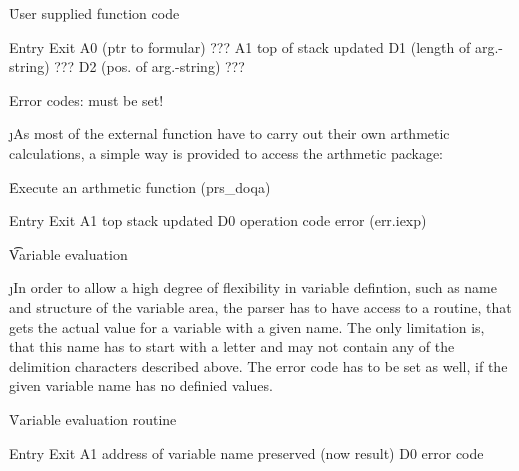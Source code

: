 \f

     User supplied function code

          Entry                         Exit
     A0  (ptr to formular)              ???
     A1   top of stack                  updated
     D1  (length of arg.-string)        ???
     D2  (pos. of arg.-string)          ???

     Error codes: must be set!


\j As most of the external function have to carry out their own
arthmetic calculations, a simple way is provided to access the
arthmetic package:

\f

     Execute an arthmetic function
     (prs_doqa)

          Entry                         Exit
     A1   top stack                     updated
     D0   operation code                error (err.iexp)



\t Variable evaluation

\j In order to allow a high degree of flexibility
in variable defintion, such as
name and structure of the variable area, the parser has to have
access to a routine, that gets the actual value for a variable with
a given name. The only limitation is, that this name has to start
with a letter and may not contain any of the delimition characters
described above. The error code has to be set as well, if the given
variable name has no definied values.

\f

     Variable evaluation routine

          Entry                    Exit
     A1   address of variable name preserved (now result)
     D0                            error code
